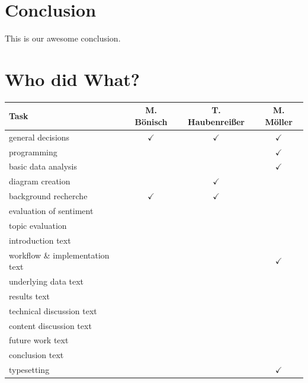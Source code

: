 \documentclass[10pt,a4paper,twocolumn]{scrartcl}
\begin{document}
\section{Conclusion}
This is our awesome conclusion.

{\footnotesize }

\onecolumn

\newpage

\section*{Who did What?}

\renewcommand{\arraystretch}{1.5}
\begin{center}
\begin{tabular}{lccc}
\toprule
Task		& M. Bönisch & T. Haubenreißer & M. Möller\\
\midrule
general decisions & $\checkmark$ & $\checkmark$ & $\checkmark$\\
programming & & & $\checkmark$\\
basic data analysis  & & & $\checkmark$\\
diagram creation  & & $\checkmark$ &\\
background recherche & $\checkmark$ & $\checkmark$ & \\
evaluation of sentiment \\
topic evaluation\\
introduction text\\
workflow \& implementation text & & & $\checkmark$\\
underlying data text\\
results text\\
technical discussion text\\
content discussion text\\
future work text\\
conclusion text\\
typesetting  & & & $\checkmark$\\
\bottomrule
\end{tabular}
\end{center}
\renewcommand{\arraystretch}{1}
\end{document}
